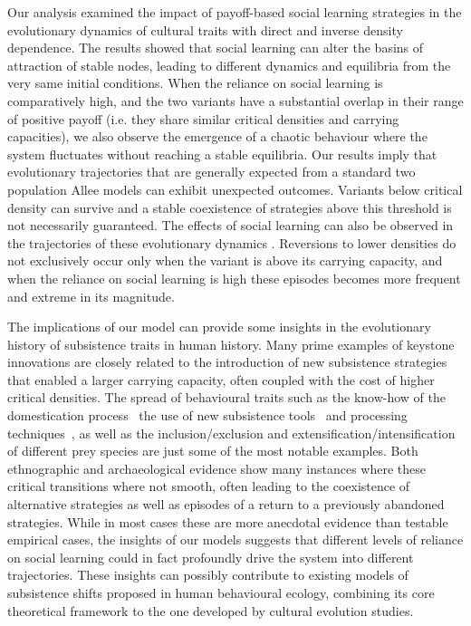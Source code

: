 \documentclass[3p,authoryear,twocolumn]{elsarticle} %
\begin{document}


Our analysis examined the impact of payoff-based social learning strategies in the evolutionary dynamics of cultural traits with direct and inverse density dependence. The results showed that social learning can alter the basins of attraction of stable nodes, leading to different dynamics and equilibria from the very same initial conditions. When the reliance on social learning is comparatively high, and  the two variants have a substantial overlap in their range of positive payoff (i.e. they share similar critical densities and carrying capacities), we also observe the emergence of a chaotic behaviour where the system fluctuates without reaching a stable equilibria. Our results imply that evolutionary trajectories that are generally expected from a standard two population Allee models can exhibit unexpected outcomes. Variants below critical density can survive and a stable coexistence of strategies above this threshold is not necessarily guaranteed. The effects of social learning can also be observed in the trajectories of these evolutionary dynamics . Reversions to lower densities do not exclusively occur only when the variant is above its carrying capacity, and when the reliance on social learning is high these episodes becomes more frequent and extreme in its magnitude. 


The implications of our model can provide some insights in the evolutionary history of subsistence traits in human history. Many prime examples of keystone innovations are closely related to the introduction of new subsistence strategies that enabled a larger carrying capacity, often coupled with the cost of higher critical densities. The spread of behavioural traits such as the know-how of the domestication process~\citep{barker2006} the use of new subsistence tools~\citep{petraglia_population_2009} and processing techniques~\citep{molleson1993}, as well as the inclusion/exclusion and extensification/intensification of different prey species are just some of the most notable examples. Both ethnographic and archaeological evidence show many instances where these critical transitions where not smooth, often leading to the coexistence of alternative strategies as well as episodes of a return to a previously abandoned strategies. %
While in most cases these are more anecdotal evidence than testable empirical cases, the insights of our models suggests that different levels of reliance on social learning could in fact profoundly drive the system into different trajectories.  These insights can possibly contribute to existing models of subsistence shifts proposed in human behavioural ecology\citep{smith1992,bird2006,kennett2006}, combining its core theoretical framework to the one developed by cultural evolution studies. 
\end{document}
